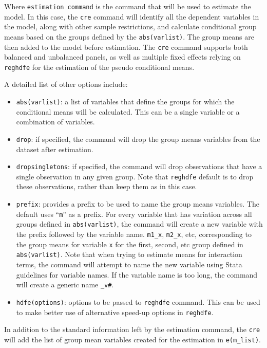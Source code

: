 \documentclass[bib]{statapress}
\providecommand{\tightlist}{%
  \setlength{\itemsep}{0pt}\setlength{\parskip}{0pt}}\usepackage{longtable,booktabs,array}
\begin{document}
Where \texttt{estimation\ command} is the command that will be used to
estimate the model. In this case, the \texttt{cre} command will identify
all the dependent variables in the model, along with other sample
restrictions, and calculate conditional group means based on the groups
defined by the \texttt{abs(varlist)}. The group means are then added to
the model before estimation. The \texttt{cre} command supports both
balanced and unbalanced panels, as well as multiple fixed effects
relying on \texttt{reghdfe} for the estimation of the pseudo conditional
means.

A detailed list of other options include:

\begin{itemize}
\tightlist
\item
  \texttt{abs(varlist)}: a list of variables that define the groups for
  which the conditional means will be calculated. This can be a single
  variable or a combination of variables.
\item
  \texttt{drop}: if specified, the command will drop the group means
  variables from the dataset after estimation.
\item
  \texttt{dropsingletons}: if specified, the command will drop
  observations that have a single observation in any given group. Note
  that \texttt{reghdfe} default is to drop these observations, rather
  than keep them as in this case.
\item
  \texttt{prefix}: provides a prefix to be used to name the group means
  variables. The default uses ``\texttt{m}'' as a prefix. For every
  variable that has variation across all groups defined in
  \texttt{abs(varlist)}, the command will create a new variable with the
  prefix followed by the variable name. \texttt{m1\_x}, \texttt{m2\_x},
  etc, corresponding to the group means for variable \texttt{x} for the
  first, second, etc group defined in \texttt{abs(varlist)}. Note that
  when trying to estimate means for interaction terms, the command will
  attempt to name the new variable using Stata guidelines for variable
  names. If the variable name is too long, the command will create a
  generic name \texttt{\_v\#}.
\item
  \texttt{hdfe(options)}: options to be passed to \texttt{reghdfe}
  command. This can be used to make better use of alternative speed-up
  options in \texttt{reghdfe}.
\end{itemize}

In addition to the standard information left by the estimation command,
the \texttt{cre} will add the list of group mean variables created for
the estimation in \texttt{e(m\_list)}.
\end{document}
